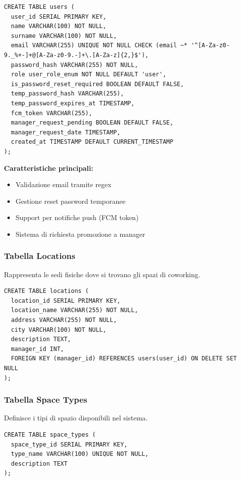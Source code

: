 \begin{lstlisting}[caption=Struttura Tabella Users]
CREATE TABLE users (
  user_id SERIAL PRIMARY KEY,
  name VARCHAR(100) NOT NULL,
  surname VARCHAR(100) NOT NULL,
  email VARCHAR(255) UNIQUE NOT NULL CHECK (email ~* '^[A-Za-z0-9._%+-]+@[A-Za-z0-9.-]+\.[A-Za-z]{2,}$'),
  password_hash VARCHAR(255) NOT NULL,
  role user_role_enum NOT NULL DEFAULT 'user',
  is_password_reset_required BOOLEAN DEFAULT FALSE,
  temp_password_hash VARCHAR(255),
  temp_password_expires_at TIMESTAMP,
  fcm_token VARCHAR(255),
  manager_request_pending BOOLEAN DEFAULT FALSE,
  manager_request_date TIMESTAMP,
  created_at TIMESTAMP DEFAULT CURRENT_TIMESTAMP
);
\end{lstlisting}

\textbf{Caratteristiche principali:}
\begin{itemize}
    \item Validazione email tramite regex
    \item Gestione reset password temporanee
    \item Support per notifiche push (FCM token)
    \item Sistema di richiesta promozione a manager
\end{itemize}

\subsubsection{Tabella Locations}
Rappresenta le sedi fisiche dove si trovano gli spazi di coworking.

\begin{lstlisting}[caption=Struttura Tabella Locations]
CREATE TABLE locations (
  location_id SERIAL PRIMARY KEY,
  location_name VARCHAR(255) NOT NULL,
  address VARCHAR(255) NOT NULL,
  city VARCHAR(100) NOT NULL,
  description TEXT,
  manager_id INT,
  FOREIGN KEY (manager_id) REFERENCES users(user_id) ON DELETE SET NULL
);
\end{lstlisting}

\newpage

\subsubsection{Tabella Space Types}
Definisce i tipi di spazio disponibili nel sistema.

\begin{lstlisting}[caption=Struttura Tabella Space Types]
CREATE TABLE space_types (
  space_type_id SERIAL PRIMARY KEY,
  type_name VARCHAR(100) UNIQUE NOT NULL,
  description TEXT
);
\end{lstlisting}

